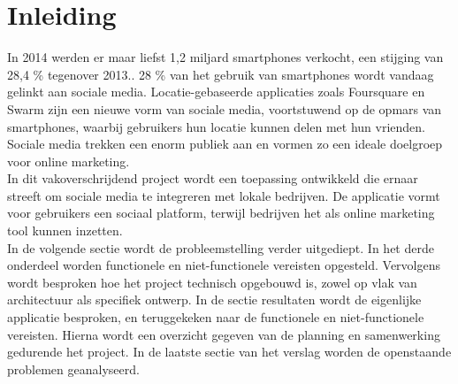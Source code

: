 \chapter{Inleiding}

In 2014 werden er maar liefst 1,2 miljard smartphones verkocht, een stijging van 28,4 \% tegenover 2013.\cite{smartphone_sales}. 28 \% van het gebruik van smartphones wordt vandaag gelinkt aan sociale media. Locatie-gebaseerde applicaties zoals Foursquare\cite{foursquare} en Swarm\cite{swarm} zijn een nieuwe vorm van sociale media, voortstuwend op de opmars van smartphones, waarbij gebruikers hun locatie kunnen delen met hun vrienden.
Sociale media trekken een enorm publiek aan en vormen zo een ideale doelgroep voor online marketing.\\

In dit vakoverschrijdend project wordt een toepassing ontwikkeld die ernaar streeft om sociale media te integreren met lokale bedrijven.
De applicatie vormt voor gebruikers een sociaal platform, terwijl bedrijven het als online marketing tool kunnen inzetten.\\

In de volgende sectie wordt de probleemstelling verder uitgediept. In het derde onderdeel worden functionele en niet-functionele vereisten opgesteld. Vervolgens wordt besproken hoe het project technisch opgebouwd is, zowel op vlak van architectuur als specifiek ontwerp. In de sectie resultaten wordt de eigenlijke applicatie besproken, en teruggekeken naar de functionele en niet-functionele vereisten. Hierna wordt een overzicht gegeven van de planning en samenwerking gedurende het project. In de laatste sectie van het verslag worden de openstaande problemen geanalyseerd.